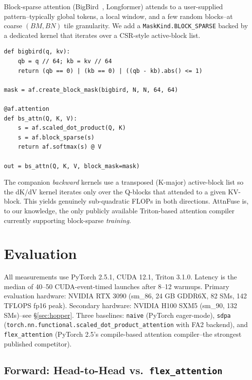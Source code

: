 \documentclass[10pt,twocolumn]{article}
\begin{document}
Block-sparse attention (BigBird~\cite{zaheer2020bigbird}, Longformer)
attends to a user-supplied pattern--typically global tokens, a local
window, and a few random blocks--at coarse $(BM, BN)$ tile granularity.
We add a \texttt{MaskKind.BLOCK\_SPARSE} backed by a dedicated kernel
that iterates over a CSR-style active-block list.

\begin{lstlisting}[caption={BigBird-style sparse attention.}]
def bigbird(q, kv):
    qb = q // 64; kb = kv // 64
    return (qb == 0) | (kb == 0) | ((qb - kb).abs() <= 1)

mask = af.create_block_mask(bigbird, N, N, 64, 64)

@af.attention
def bs_attn(Q, K, V):
    s = af.scaled_dot_product(Q, K)
    s = af.block_sparse(s)
    return af.softmax(s) @ V

out = bs_attn(Q, K, V, block_mask=mask)
\end{lstlisting}

The companion \emph{backward} kernels use a transposed (K-major)
active-block list so the dK/dV kernel iterates only over the Q-blocks
that attended to a given KV-block. This yields genuinely sub-quadratic
FLOPs in both directions. AttnFuse is, to our knowledge, the only
publicly available Triton-based attention compiler currently supporting
block-sparse \emph{training}.

\section{Evaluation}
\label{sec:eval}

All measurements use PyTorch 2.5.1, CUDA 12.1, Triton 3.1.0. Latency
is the median of 40--50 CUDA-event-timed launches after 8--12 warmups.
Primary evaluation hardware: NVIDIA RTX 3090 (sm\_86, 24 GB GDDR6X, 82
SMs, 142 TFLOPS fp16 peak). Secondary hardware: NVIDIA H100 SXM5
(sm\_90, 132 SMs)--see \S\ref{sec:hopper}. Three baselines:
\texttt{naive} (PyTorch eager-mode), \texttt{sdpa}
(\texttt{torch.nn.functional.scaled\_dot\_product\_attention} with FA2
backend), and \texttt{flex\_attention} (PyTorch 2.5's compile-based
attention compiler--the strongest published competitor).

\subsection{Forward: Head-to-Head vs.\ \texttt{flex\_attention}}
\end{document}
